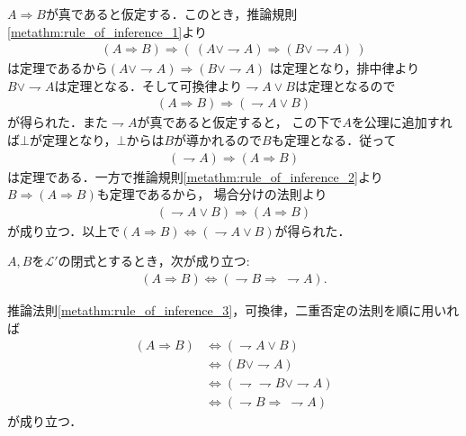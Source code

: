 	\begin{prf}
		$A \Longrightarrow B$が真であると仮定する．このとき，推論規則\ref{metathm:rule_of_inference_1}より
		\begin{align}
			(A \Longrightarrow B) \Longrightarrow 
			(\ (A \vee \rightharpoondown A) \Longrightarrow (B \vee \rightharpoondown A)\ )
		\end{align}
		は定理であるから$(A \vee \rightharpoondown A) \Longrightarrow (B \vee \rightharpoondown A)$
		は定理となり，排中律より$B \vee \rightharpoondown A$は定理となる．そして可換律より$\rightharpoondown A \vee B$は定理となるので
		\begin{align}
			(A \Longrightarrow B) \Longrightarrow (\rightharpoondown A \vee B)
		\end{align}
		が得られた．また$\rightharpoondown A$が真であると仮定すると，
		この下で$A$を公理に追加すれば$\bot$が定理となり，$\bot$からは$B$が導かれるので$B$も定理となる．従って
		\begin{align}
			(\rightharpoondown A) \Longrightarrow (A \Longrightarrow B)
		\end{align}
		は定理である．一方で推論規則\ref{metathm:rule_of_inference_2}より$B \Longrightarrow (A \Longrightarrow B)$も定理であるから，
		場合分けの法則より
		\begin{align}
			(\rightharpoondown A \vee B) \Longrightarrow (A \Longrightarrow B)
		\end{align}
		が成り立つ．以上で$(A \Longrightarrow B) \Longleftrightarrow (\rightharpoondown A \vee B)$が得られた．
		\QED
	\end{prf}
	
	\begin{screen}
		\begin{metathm}[対偶命題は同値]
			$A,B$を$\mathcal{L}'$の閉式とするとき，次が成り立つ:
			\begin{align}
				(A \Longrightarrow B) \Longleftrightarrow (\rightharpoondown B \Longrightarrow\ \rightharpoondown A).
			\end{align}
		\end{metathm}
	\end{screen}
	
	\begin{prf}
		推論法則\ref{metathm:rule_of_inference_3}，可換律，二重否定の法則を順に用いれば
		\begin{align}
			(A \Longrightarrow B) &\Longleftrightarrow (\rightharpoondown A \vee B) \\
			&\Longleftrightarrow (B \vee \rightharpoondown A) \\
			&\Longleftrightarrow (\rightharpoondown \rightharpoondown B \vee \rightharpoondown A) \\
			&\Longleftrightarrow (\rightharpoondown B \Longrightarrow\ \rightharpoondown A)
		\end{align}
		が成り立つ．
		\QED
	\end{prf}
	
